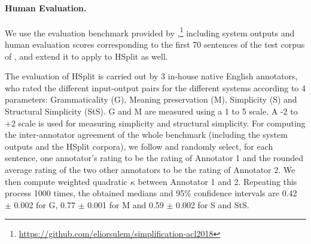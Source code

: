 \documentclass[11pt,a4paper]{article}
\begin{document}
\paragraph{Human Evaluation.}\label{sec:human_evaluation}
We use the evaluation benchmark provided by \citet{S18acl},\footnote{\url{https://github.com/eliorsulem/simplification-acl2018}} including system outputs and human evaluation scores corresponding to the first 70 sentences of the test corpus of \citet{Xu16}, and extend it to apply to HSplit as well.

The evaluation of HSplit is carried out by 3 in-house native English annotators, 
who rated the different input-output pairs for the different systems according to 4 parameters: Grammaticality (G), 
Meaning preservation (M), Simplicity (S) and Structural Simplicity (StS). 
G and M are measured using a 1 to 5 scale. A -2 to +2 scale is used for measuring simplicity and structural simplicity. %
For computing the inter-annotator agreement of the whole benchmark (including the system outputs and the HSplit corpora), we follow \citet{PT16} and randomly select, for each sentence, one annotator's rating to be the rating of Annotator 1 and the rounded average rating of the two other annotators to be the rating of Annotator 2. We then compute weighted quadratic $\kappa$ \citep{C68} between Annotator 1 and 2. Repeating this process 1000 times, the obtained medians and 95$\%$ confidence intervals are 0.42 $\pm$ 0.002 for G, 0.77 $\pm$ 0.001 for M and 0.59 $\pm$ 0.002 for S and StS.
\end{document}
